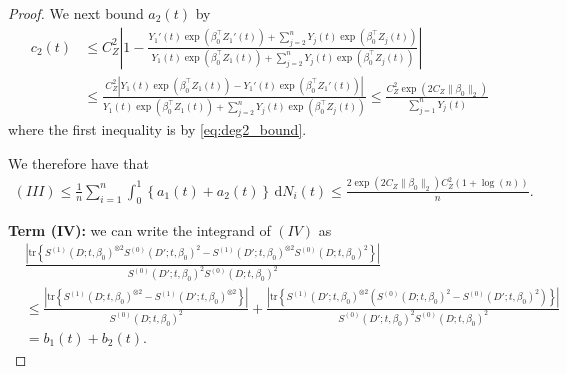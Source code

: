 \documentclass[10pt,a4paper]{amsart}
\newcommand{\dint}{\,\mathrm{d}}
\begin{document}
\begin{proof}
We next bound $a_2(t)$ by 
\begin{align*}
    c_2(t) &\leq C_Z^2 \left| 1 - \frac{Y_1'(t) \exp(\beta_0^\top Z_1'(t)) + \sum_{j=2}^n Y_j(t) \exp(\beta_0^\top Z_j(t))}{Y_1(t) \exp(\beta_0^\top Z_1(t)) + \sum_{j=2}^n Y_j(t) \exp(\beta_0^\top Z_j(t))} \right| \\
    &\leq \frac{C_Z^2 |Y_1(t) \exp(\beta_0^\top Z_1(t)) - Y_1'(t) \exp(\beta_0^\top Z_1'(t))|}{Y_1(t) \exp(\beta_0^\top Z_1(t)) + \sum_{j=2}^n Y_j(t) \exp(\beta_0^\top Z_j(t))} \leq \frac{C_Z^2 \exp(2C_Z\|\beta_0\|_2)}{\sum_{j=1}^n Y_j(t)}
\end{align*}
where the first inequality is by \eqref{eq:deg2_bound}.

We therefore have that 
\begin{align*}
    (III) \leq \frac{1}{n} \sum_{i=1}^n \int_0^1 \left\{a_1(t) + a_2(t)\right\} \dint N_i(t) \leq  \frac{2 \exp(2C_Z\|\beta_0\|_2)C_Z^2(1 + \log (n))}{n}.
\end{align*}


\bigskip
\noindent \textbf{Term (IV):} we can write the integrand of $(IV)$ as 
    \begin{align*}
   &\frac{ \left|\mathrm{tr} \left\{S^{(1)}(D; t, \beta_0)^{\otimes 2} S^{(0)}(D'; t, \beta_0)^2 - S^{(1)}(D'; t, \beta_0)^{\otimes 2} S^{(0)}(D; t, \beta_0)^2 \right\} \right|}{S^{(0)}(D';t, \beta_0)^2 S^{(0)}(D; t, \beta_0)^2} \\
   &\leq \frac{ \left|\mathrm{tr} \left\{S^{(1)}(D; t, \beta_0)^{\otimes 2}  - S^{(1)}(D'; t, \beta_0)^{\otimes 2} \right\} \right|}{S^{(0)}(D;t, \beta_0)^2} + \frac{ \left|\mathrm{tr} \left\{S^{(1)}(D'; t, \beta_0)^{\otimes 2} \left(S^{(0)}(D;t, \beta_0)^2 - S^{(0)}(D'; t, \beta_0)^2\right) \right\} \right|}{S^{(0)}(D'; t, \beta_0)^2S^{(0)}(D;t, \beta_0)^2} \\
   &= b_1(t) + b_2(t).
\end{align*}


\end{proof}
\end{document}
